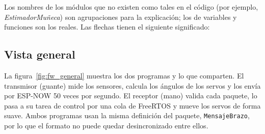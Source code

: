 Los nombres de los módulos que no existen como tales en el código (por ejemplo, \emph{EstimadorMuñeca}) son agrupaciones para la explicación; los de variables y funciones son los reales. Las flechas tienen el siguiente significado:

\begin{center}
\end{center}

\subsection{Vista general}

La figura~\ref{fig:fw_general} muestra los dos programas y lo que comparten. El transmisor (guante) mide los sensores, calcula los ángulos de los servos y los envía por ESP-NOW 50 veces por segundo. El receptor (mano) valida cada paquete, lo pasa a su tarea de control por una cola de FreeRTOS y mueve los servos de forma suave. Ambos programas usan la misma definición del paquete, \texttt{MensajeBrazo}, por lo que el formato no puede quedar desincronizado entre ellos.

